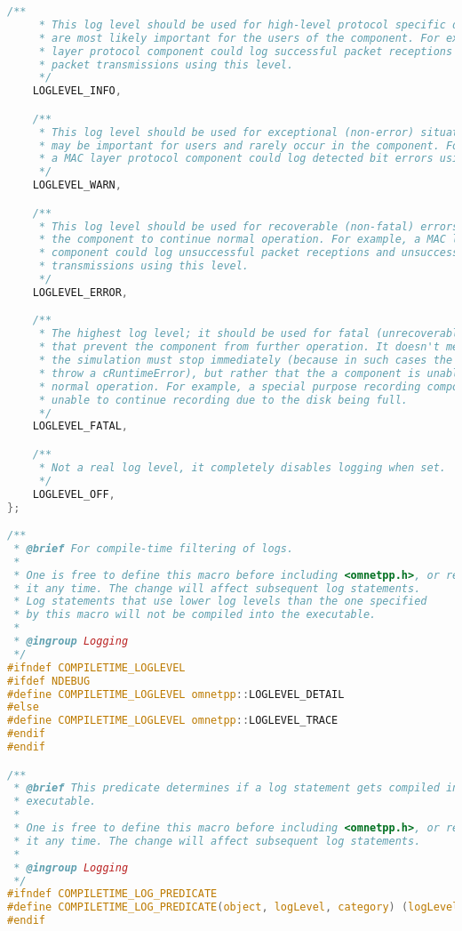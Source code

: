 \begin{lstlisting}[language=c]
    /**
     * This log level should be used for high-level protocol specific details that
     * are most likely important for the users of the component. For example, a MAC
     * layer protocol component could log successful packet receptions and successful
     * packet transmissions using this level.
     */
    LOGLEVEL_INFO,

    /**
     * This log level should be used for exceptional (non-error) situations that
     * may be important for users and rarely occur in the component. For example,
     * a MAC layer protocol component could log detected bit errors using this level.
     */
    LOGLEVEL_WARN,

    /**
     * This log level should be used for recoverable (non-fatal) errors that allow
     * the component to continue normal operation. For example, a MAC layer protocol
     * component could log unsuccessful packet receptions and unsuccessful packet
     * transmissions using this level.
     */
    LOGLEVEL_ERROR,

    /**
     * The highest log level; it should be used for fatal (unrecoverable) errors
     * that prevent the component from further operation. It doesn't mean that
     * the simulation must stop immediately (because in such cases the code should
     * throw a cRuntimeError), but rather that the a component is unable to continue
     * normal operation. For example, a special purpose recording component may be
     * unable to continue recording due to the disk being full.
     */
    LOGLEVEL_FATAL,

    /**
     * Not a real log level, it completely disables logging when set.
     */
    LOGLEVEL_OFF,
};

/**
 * @brief For compile-time filtering of logs.
 *
 * One is free to define this macro before including <omnetpp.h>, or redefine
 * it any time. The change will affect subsequent log statements.
 * Log statements that use lower log levels than the one specified
 * by this macro will not be compiled into the executable.
 *
 * @ingroup Logging
 */
#ifndef COMPILETIME_LOGLEVEL
#ifdef NDEBUG
#define COMPILETIME_LOGLEVEL omnetpp::LOGLEVEL_DETAIL
#else
#define COMPILETIME_LOGLEVEL omnetpp::LOGLEVEL_TRACE
#endif
#endif

/**
 * @brief This predicate determines if a log statement gets compiled into the
 * executable.
 *
 * One is free to define this macro before including <omnetpp.h>, or redefine
 * it any time. The change will affect subsequent log statements.
 *
 * @ingroup Logging
 */
#ifndef COMPILETIME_LOG_PREDICATE
#define COMPILETIME_LOG_PREDICATE(object, logLevel, category) (logLevel >= COMPILETIME_LOGLEVEL)
#endif


\end{lstlisting}
